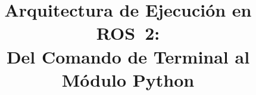 \documentclass[conference]{IEEEtran}
\begin{document}
\title{Arquitectura de Ejecución en ROS~2:\\
Del Comando de Terminal al Módulo Python}



\maketitle














\end{document}
